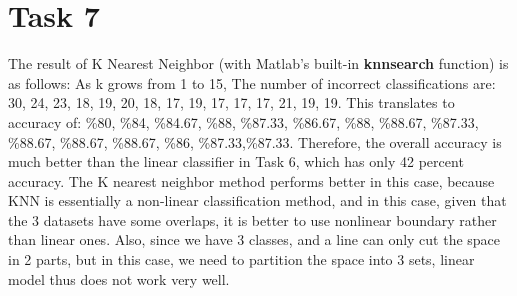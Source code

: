 \documentclass[11pt]{article}
\theoremstyle{plain}
\theoremstyle{definition}
\begin{document}
\section{Task 7}
The result of K Nearest Neighbor (with Matlab's built-in \textbf{knnsearch} function) is as follows: As k grows from 1 to 15, The number of incorrect classifications are: 30, 24, 23, 18, 19, 20, 18, 17, 19, 17, 17, 17, 21, 19, 19. This translates to accuracy of: \%80, \%84, \%84.67, \%88, \%87.33, \%86.67, \%88, \%88.67, \%87.33, \%88.67, \%88.67, \%88.67, \%86, \%87.33,\%87.33. Therefore, the overall accuracy is much better than the linear classifier in Task 6, which has only 42 percent accuracy. The K nearest neighbor method performs better in this case, because KNN is essentially a non-linear classification method, and in this case, given that the 3 datasets have some overlaps, it is better to use nonlinear boundary rather than linear ones. Also, since we have 3 classes, and a line can only cut the space in 2 parts, but in this case, we need to partition the space into 3 sets, linear model thus does not work very well. 
\end{document}
